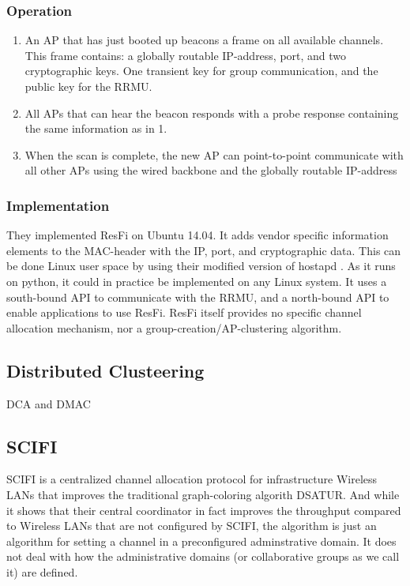 \subsubsection{Operation}
\begin{enumerate}
	\item An AP that has just booted up beacons a frame on all available channels. This frame contains: a globally routable IP-address, port, and two cryptographic keys. One transient key for group communication, and the public key for the RRMU.  
	\item All APs that can hear the beacon responds with a probe response containing the same information as in 1.
	\item When the scan is complete, the new AP can point-to-point communicate with all other APs using the wired backbone and the globally routable IP-address
\end{enumerate}

\subsubsection{Implementation}
They implemented ResFi on Ubuntu 14.04. It adds vendor specific information elements to the MAC-header with the IP, port, and cryptographic data. This can be done Linux user space by using their modified version of hostapd \cite{resfigit}.
As it runs on python, it could in practice be implemented on any Linux system. It uses a south-bound API to communicate with the RRMU, and a north-bound API to enable applications to use ResFi.
ResFi itself provides no specific channel allocation mechanism, nor a group-creation/AP-clustering algorithm.

\subsection{Distributed Clusteering}
DCA and DMAC

\subsection{SCIFI} SCIFI \cite{SCIFI} is a centralized channel allocation protocol for infrastructure Wireless LANs that improves the traditional graph-coloring algorith DSATUR. 
		And while it shows that their central coordinator in fact improves the throughput compared to Wireless LANs that are not configured by SCIFI, the algorithm is just an algorithm for setting a channel in a preconfigured adminstrative domain. It does not deal with how the administrative domains (or collaborative groups as we call it) are defined. 


